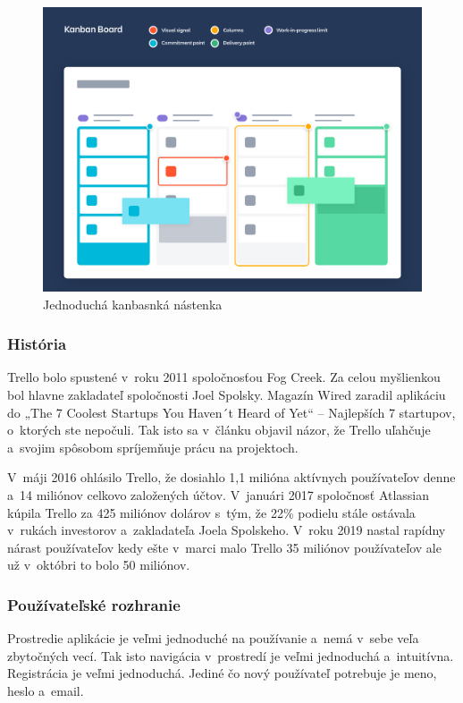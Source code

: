 \begin{figure}[H]
    \centering
    \includegraphics[scale=0.30]{img/obr4.png}
    \caption{Jednoduchá kanbasnká nástenka}
    \label{fig:kab-nas}
\end{figure}

\subsubsection{História}
\indent Trello bolo spustené v roku 2011 spoločnosťou Fog Creek. Za celou myšlienkou bol hlavne zakladateľ spoločnosti Joel Spolsky. Magazín Wired zaradil aplikáciu do „The 7 Coolest Startups You Haven´t Heard of Yet“ – Najlepších 7 startupov, o ktorých ste nepočuli. Tak isto sa v článku objavil názor, že Trello uľahčuje a svojim spôsobom spríjemňuje prácu na projektoch. 

\indent V máji 2016 ohlásilo Trello, že dosiahlo 1,1 milióna aktívnych používateľov denne a 14 miliónov celkovo založených účtov. V januári 2017 spoločnosť Atlassian kúpila Trello za 425 miliónov dolárov s tým, že 22\% podielu stále ostávala v rukách investorov a zakladateľa Joela Spolskeho. V roku 2019 nastal rapídny nárast používateľov kedy ešte v marci malo Trello 35 miliónov používateľov ale už v októbri to bolo 50 miliónov.
\subsubsection{Používateľské rozhranie}
\indent Prostredie aplikácie je veľmi jednoduché na používanie a nemá v sebe veľa zbytočných vecí. Tak isto navigácia v prostredí je veľmi jednoduchá a intuitívna. Registrácia je veľmi jednoduchá. Jediné čo nový používateľ potrebuje je meno, heslo a email. 

